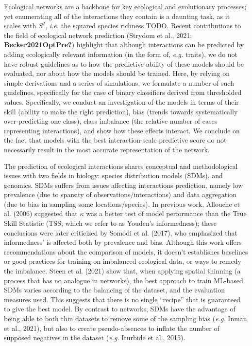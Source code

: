 \documentclass[11pt]{article}
\begin{document}
\vfill

\clearpage
\linenumbers
\pagestyle{normal}

Ecological networks are a backbone for key ecological and evolutionary
processes; yet enumerating all of the interactions they contain is a
daunting task, as it scales with \(S^2\), \emph{i.e.} the squared
species richness TODO. Recent contributions to the field of ecological
network prediction (Strydom et al., 2021; \textbf{Becker2021OptPre?})
highlight that although interactions can be predicted by adding
ecologically relevant information (in the form of, \emph{e.g.} traits),
we do not have robust guidelines as to how the predictive ability of
these models should be evaluated, nor about how the models should be
trained. Here, by relying on simple derivations and a series of
simulations, we formulate a number of such guidelines, specifically for
the case of binary classifiers derived from thresholded values.
Specifically, we conduct an investigation of the models in terms of
their skill (ability to make the right prediction), bias (trends towards
systematically over-predicting one class), class imbalance (the relative
number of cases representing interactions), and show how these effects
interact. We conclude on the fact that models with the best
interaction-scale predictive score do not necessarily result in the most
accurate representation of the network.

The prediction of ecological interactions shares conceptual and
methodological issues with two fields in biology: species distribution
models (SDMs), and genomics. SDMs suffers from issues affecting
interactions prediction, namely low prevalence (due to sparsity of
observations/interactions) and data aggregation (due to bias in sampling
some locations/species). In previous work, Allouche et al. (2006)
suggested that \(\kappa\) was a better test of model performance than
the True Skill Statistic (TSS; which we refer to as Youden's
informedness); these conclusions were later criticized by Somodi et al.
(2017), who emphasized that informedness' is affected both by prevalence
and bias. Although this work offers recommendations about the comparison
of models, it doesn't establishes baselines or good practices for
training on imbalanced ecological data, or ways to remedy the imbalance.
Steen et al. (2021) show that, when applying spatial thinning (a process
that has no analogue in networks), the best approach to train ML-based
SDMs varies according to the balancing of the dataset, and the
evaluation measures used. This suggests that there is no single
``recipe'' that is guaranteed to give the best model. By contrast to
networks, SDMs have the advantage of being able to both thin datasets to
remove some of the sampling bias (\emph{e.g.} Inman et al., 2021), but
also to create pseudo-absences to inflate the number of supposed
negatives in the dataset (\emph{e.g.} Iturbide et al., 2015).
\end{document}
